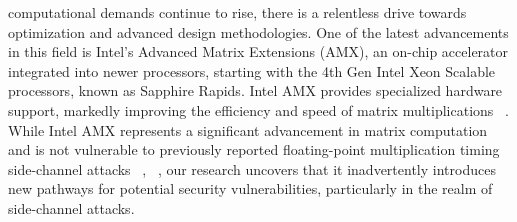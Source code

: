 \newpage

computational demands continue to rise, there is a relentless drive towards optimization and advanced design methodologies. One of the latest advancements in this field is Intel's Advanced Matrix Extensions (AMX), an on-chip accelerator integrated into newer processors, starting with the 4th Gen Intel Xeon Scalable processors, known as Sapphire Rapids. Intel AMX provides specialized hardware support, markedly improving the efficiency and speed of matrix multiplications ~\cite{intel2022amx}. While Intel AMX represents a significant advancement in matrix computation and is not vulnerable to previously reported floating-point multiplication timing side-channel attacks ~\cite{7163051}, ~\cite{9218707}, our research uncovers that it inadvertently introduces new pathways for potential security vulnerabilities, particularly in the realm of side-channel attacks.



